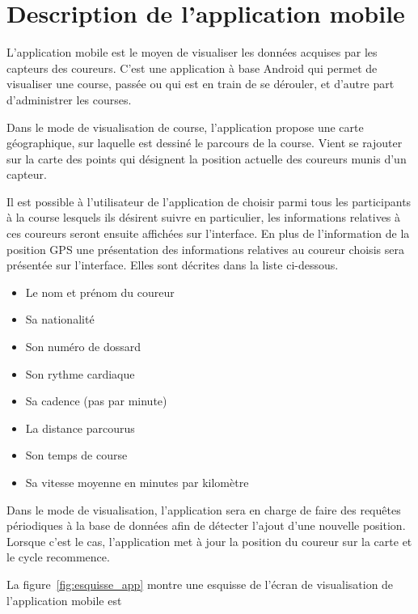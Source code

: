 
\chapter{Description de l'application mobile}

L’application mobile est le moyen de visualiser les données acquises par les capteurs des coureurs. C’est une application à base Android qui permet de visualiser une course, passée ou qui est en train de se dérouler, et d’autre part d’administrer les courses.

Dans le mode de visualisation de course, l’application propose une carte géographique, sur laquelle est dessiné le parcours de la course. Vient se rajouter sur la carte des points qui désignent la position actuelle des coureurs munis d’un capteur.

Il est possible à l’utilisateur de l’application de choisir parmi tous les participants à la course lesquels ils désirent suivre en particulier, les informations relatives à ces coureurs seront ensuite affichées sur l’interface. En plus de l’information de la position GPS une présentation des informations relatives au coureur choisis sera présentée sur l’interface. Elles sont décrites dans la liste ci-dessous.

\begin{itemize}
\item Le nom et prénom du coureur
\item Sa nationalité
\item Son numéro de dossard
\item Son rythme cardiaque
\item Sa cadence (pas par minute)
\item La distance parcourus
\item Son temps de course
\item Sa vitesse moyenne en minutes par kilomètre
\end{itemize}

Dans le mode de visualisation, l’application sera en charge de faire des requêtes périodiques à la base de données afin de détecter l’ajout d’une nouvelle position. Lorsque c’est le cas, l’application met à jour la position du coureur sur la carte et le cycle recommence.

La figure~\ref{fig:esquisse_app} montre une esquisse de l'écran de visualisation de l'application mobile est 

